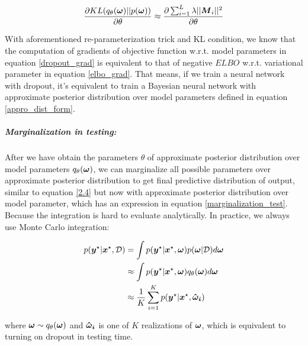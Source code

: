 \begin{equation} 
\begin{aligned}\label{KL_grad}
\frac{\partial KL(q_{\theta}(\boldsymbol \omega)||p(\boldsymbol \omega))}{\partial \theta} \approx \frac{\partial \sum_{i=1}^{L}\lambda||\boldsymbol M_{i}||^{2}}{\partial \theta}
\end{aligned}
\end{equation}

With aforementioned re-parameterization trick and KL condition, we know that the computation of gradients of objective function w.r.t. model parameters in equation \ref{dropout_grad} is equivalent to that of negative $ELBO$ w.r.t. variational parameter in equation \ref{elbo_grad}. That means, if we train a neural network with dropout, it's equivalent to train a Bayesian neural network with approximate posterior distribution over model parameters defined in equation \ref{appro_dist_form}.

\subparagraph{Marginalization in testing:}
After we have obtain the parameters $\theta$ of approximate posterior distribution over model parameters $q_{\theta}(\boldsymbol \omega)$, we can marginalize all possible parameters over approximate posterior distribution to get final predictive distribution of output, similar to equation \ref{2.4} but now with approximate posterior distribution over model parameter, which has an expression in equation \ref{marginalization_test}. Because the integration is hard to evaluate analytically. In practice, we always use Monte Carlo integration:

\begin{equation}
\begin{aligned} \label{marginalization_test}
p(\boldsymbol y^{\star}| \boldsymbol x^{\star},\mathcal D) &= \int p(\boldsymbol y^{\star} | \boldsymbol x^{\star}, \boldsymbol \omega) p(\boldsymbol \omega |\mathcal D)d\boldsymbol \omega \\
&\approx \int p(\boldsymbol y^{\star} | \boldsymbol x^{\star}, \boldsymbol \omega) q_{\theta}(\boldsymbol \omega)d\boldsymbol \omega \\
&\approx \frac{1}{K}\sum_{i=1}^{K} p(\boldsymbol y^{\star} | \boldsymbol x^{\star}, \boldsymbol{\hat \omega_{i}}) 
\end{aligned}
\end{equation}

where $\boldsymbol \omega \sim q_{\theta}(\boldsymbol \omega)$ and $\boldsymbol{\hat \omega_{i}}$ is one of $K$ realizations of $\boldsymbol \omega$, which is equivalent to turning on dropout in testing time. 


